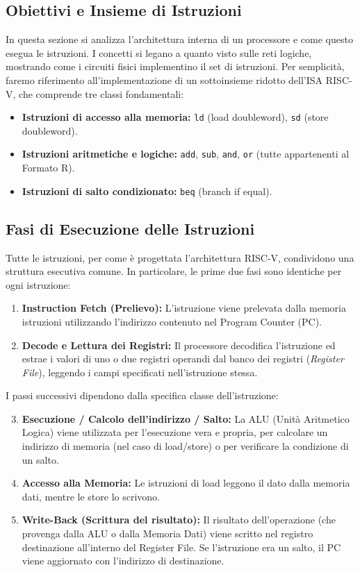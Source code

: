 \documentclass[12pt, a4paper]{article}
\begin{document}
\subsection{Obiettivi e Insieme di Istruzioni}
In questa sezione si analizza l'architettura interna di un processore e come questo esegua le istruzioni. I concetti si legano a quanto visto sulle reti logiche, mostrando come i circuiti fisici implementino il set di istruzioni.
Per semplicità, faremo riferimento all'implementazione di un sottoinsieme ridotto dell'ISA RISC-V, che comprende tre classi fondamentali:
\begin{itemize}
    \item \textbf{Istruzioni di accesso alla memoria:} \texttt{ld} (load doubleword), \texttt{sd} (store doubleword).
    \item \textbf{Istruzioni aritmetiche e logiche:} \texttt{add}, \texttt{sub}, \texttt{and}, \texttt{or} (tutte appartenenti al Formato R).
    \item \textbf{Istruzioni di salto condizionato:} \texttt{beq} (branch if equal).
\end{itemize}

\subsection{Fasi di Esecuzione delle Istruzioni}
Tutte le istruzioni, per come è progettata l'architettura RISC-V, condividono una struttura esecutiva comune. In particolare, le prime due fasi sono identiche per ogni istruzione:
\begin{enumerate}
    \item \textbf{Instruction Fetch (Prelievo):} L'istruzione viene prelevata dalla memoria istruzioni utilizzando l'indirizzo contenuto nel Program Counter (PC).
    \item \textbf{Decode e Lettura dei Registri:} Il processore decodifica l'istruzione ed estrae i valori di uno o due registri operandi dal banco dei registri (\textit{Register File}), leggendo i campi specificati nell'istruzione stessa.
\end{enumerate}
I passi successivi dipendono dalla specifica classe dell'istruzione:
\begin{enumerate}
    \setcounter{enumi}{2}
    \item \textbf{Esecuzione / Calcolo dell'indirizzo / Salto:} La ALU (Unità Aritmetico Logica) viene utilizzata per l'esecuzione vera e propria, per calcolare un indirizzo di memoria (nel caso di load/store) o per verificare la condizione di un salto.
    \item \textbf{Accesso alla Memoria:} Le istruzioni di load leggono il dato dalla memoria dati, mentre le store lo scrivono.
    \item \textbf{Write-Back (Scrittura del risultato):} Il risultato dell'operazione (che provenga dalla ALU o dalla Memoria Dati) viene scritto nel registro destinazione all'interno del Register File. Se l'istruzione era un salto, il PC viene aggiornato con l'indirizzo di destinazione.
\end{enumerate}
\end{document}
